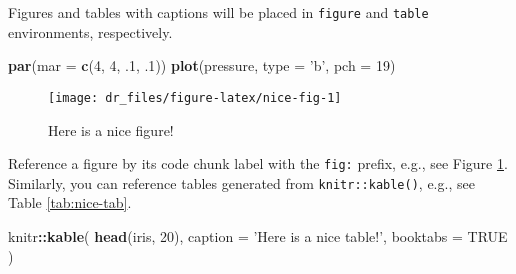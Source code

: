 \documentclass[
]{book}
\newenvironment{Shaded}{\begin{snugshade}}{\end{snugshade}}
\newcommand{\DataTypeTok}[1]{\textcolor[rgb]{0.13,0.29,0.53}{#1}}
\newcommand{\DecValTok}[1]{\textcolor[rgb]{0.00,0.00,0.81}{#1}}
\newcommand{\FloatTok}[1]{\textcolor[rgb]{0.00,0.00,0.81}{#1}}
\newcommand{\KeywordTok}[1]{\textcolor[rgb]{0.13,0.29,0.53}{\textbf{#1}}}
\newcommand{\NormalTok}[1]{#1}
\newcommand{\OperatorTok}[1]{\textcolor[rgb]{0.81,0.36,0.00}{\textbf{#1}}}
\newcommand{\OtherTok}[1]{\textcolor[rgb]{0.56,0.35,0.01}{#1}}
\newcommand{\StringTok}[1]{\textcolor[rgb]{0.31,0.60,0.02}{#1}}
\begin{document}
Figures and tables with captions will be placed in \texttt{figure} and \texttt{table} environments, respectively.

\begin{Shaded}
\begin{Highlighting}[]
\KeywordTok{par}\NormalTok{(}\DataTypeTok{mar =} \KeywordTok{c}\NormalTok{(}\DecValTok{4}\NormalTok{, }\DecValTok{4}\NormalTok{, }\FloatTok{.1}\NormalTok{, }\FloatTok{.1}\NormalTok{))}
\KeywordTok{plot}\NormalTok{(pressure, }\DataTypeTok{type =} \StringTok{'b'}\NormalTok{, }\DataTypeTok{pch =} \DecValTok{19}\NormalTok{)}
\end{Highlighting}
\end{Shaded}

\begin{figure}

{\centering \texttt{[image: dr\_files/figure-latex/nice-fig-1]} 

}

\caption{Here is a nice figure!}\label{fig:nice-fig}
\end{figure}

Reference a figure by its code chunk label with the \texttt{fig:} prefix, e.g., see Figure \ref{fig:nice-fig}. Similarly, you can reference tables generated from \texttt{knitr::kable()}, e.g., see Table \ref{tab:nice-tab}.

\begin{Shaded}
\begin{Highlighting}[]
\NormalTok{knitr}\OperatorTok{::}\KeywordTok{kable}\NormalTok{(}
  \KeywordTok{head}\NormalTok{(iris, }\DecValTok{20}\NormalTok{), }\DataTypeTok{caption =} \StringTok{'Here is a nice table!'}\NormalTok{,}
  \DataTypeTok{booktabs =} \OtherTok{TRUE}
\NormalTok{)}
\end{Highlighting}
\end{Shaded}
\end{document}
